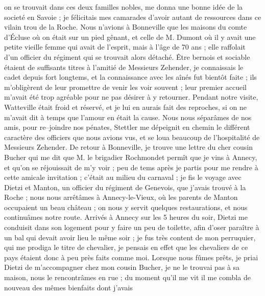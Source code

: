 \documentclass[12pt]{article}
\begin{document}
 on se trouvait dans ces deux familles nobles, me donna
une bonne idée de la societé en Savoie ; je félicitais mes camarades d’avoir autant de ressources
dans ce vilain trou de la Roche. Nous n’avions à Bonneville que les maisons du comte d’Écluse où on
était sur un pied gênant, et celle de M. Dumont où il y avait une petite vieille femme qui avait de
l’esprit, mais à l’âge de 70 ans ; elle raffolait d’un officier du régiment qui se trouvait alors
détaché. Être bernois et sociable étaient de suffisants titres à l’amitié de Messieurs Zehender, je
connaissais le cadet depuis fort longtems, et la connaissance avec les aînés fut bientôt faite ; ils
m’obligèrent de leur promettre de venir les voir souvent ; leur premier accueil m’avait été trop
agréable pour ne pas désirer à y retourner. Pendant notre visite, Watteville était froid et réservé,
et je lui en aurais fait des reproches, si on ne m’avait dit à temps que l’amour en était la cause.
Nous nous séparâmes de nos amis, pour re–joindre nos pénates, Stettler me dépeignit en chemin le
différent caractère des officiers que nous avions vus, et se loua beaucoup de l’hospitalité de
Messieurs Zehender. De retour à Bonneville, je trouve une lettre du cher cousin Bucher qui me dit
que M. le brigadier Rochmondet permît que je vins à Annecy, et qu’on se réjouissait de m’y voir ;
peu de tems après je partis pour me rendre à cette amicale invitation ; c’était au milieu du
carnaval ; je fis le voyage avec Dietzi et Manton, un officier du régiment de Genevois, que j’avais
trouvé à la Roche ; nous nous arrêtâmes à Annecy-le-Vieux, où les parents de Manton occupaient un
beau château ; on nous y servit quelques restaurations, et nous continuâmes notre route. Arrivés à
Annecy sur les 5 heures du soir, Dietzi me conduisit dans son logement pour y faire un peu de
toilette, afin d’oser paraître à un bal qui devait avoir lieu le même soir ; je fus très content de
mon perruquier, qui me prodiga le titre de chevalier, je pensais en effet que les chevaliers de ce
pays étaient donc à peu près faits comme moi. Lorsque nous fûmes prêts, je priai Dietzi de
m’accompagner chez mon cousin Bucher, je ne le trouvai pas à sa maison, nous le rencontrâmes en rue
; du moment qu’il me vit il me combla de nouveau des mêmes bienfaits dont j’avais
\end{document}

